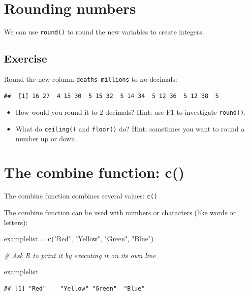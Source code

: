 \documentclass[]{book}
\makeatletter
\newenvironment{Shaded}{\begin{snugshade}}{\end{snugshade}}
\newcommand{\KeywordTok}[1]{\textcolor[rgb]{0.13,0.29,0.53}{\textbf{#1}}}
\newcommand{\StringTok}[1]{\textcolor[rgb]{0.31,0.60,0.02}{#1}}
\newcommand{\CommentTok}[1]{\textcolor[rgb]{0.56,0.35,0.01}{\textit{#1}}}
\newcommand{\NormalTok}[1]{#1}
\newenvironment{kframe}{%
\medskip{}
\setlength{\fboxsep}{.8em}
 \def\at@end@of@kframe{}%
 \ifinner\ifhmode%
  \def\at@end@of@kframe{\end{minipage}}%
  \begin{minipage}{\columnwidth}%
 \fi\fi%
 \def\FrameCommand##1{\hskip\@totalleftmargin \hskip-\fboxsep
 \colorbox{shadecolor}{##1}\hskip-\fboxsep
     \hskip-\linewidth \hskip-\@totalleftmargin \hskip\columnwidth}%
 \MakeFramed {\advance\hsize-\width
   \@totalleftmargin\z@ \linewidth\hsize
   \@setminipage}}%
 {\par\unskip\endMakeFramed%
 \at@end@of@kframe}
\renewenvironment{Shaded}{\begin{kframe}}{\end{kframe}}
\makeatother
\begin{document}
\section{Rounding numbers}\label{rounding-numbers}

We can use \texttt{round()} to round the new variables to create
integers.

\subsection{Exercise}\label{exercise-10}

Round the new column \texttt{deaths\_millions} to no decimals:

\begin{verbatim}
##  [1] 16 27  4 15 30  5 15 32  5 14 34  5 12 36  5 12 38  5
\end{verbatim}

\begin{itemize}
\item
  How would you round it to 2 decimals? Hint: use F1 to investigate
  \texttt{round()}.
\item
  What do \texttt{ceiling()} and \texttt{floor()} do? Hint: sometimes
  you want to round a number up or down.
\end{itemize}

\section{The combine function: c()}\label{the-combine-function-c}

The combine function combines several values: \texttt{c()}

The combine function can be used with numbers or characters (like words
or letters):

\begin{Shaded}
\begin{Highlighting}[]
\NormalTok{examplelist =}\StringTok{ }\KeywordTok{c}\NormalTok{(}\StringTok{"Red"}\NormalTok{, }\StringTok{"Yellow"}\NormalTok{, }\StringTok{"Green"}\NormalTok{, }\StringTok{"Blue"}\NormalTok{)}

\CommentTok{# Ask R to print it by executing it on its own line}

\NormalTok{examplelist}
\end{Highlighting}
\end{Shaded}

\begin{verbatim}
## [1] "Red"    "Yellow" "Green"  "Blue"
\end{verbatim}
\end{document}
